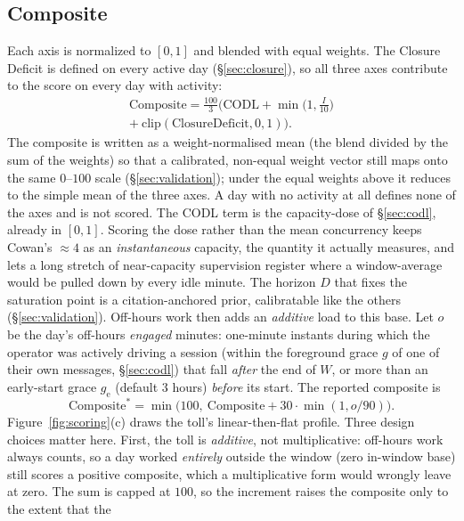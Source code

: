 \documentclass[10pt,twocolumn]{article}
\begin{document}
\subsection{Composite}\label{sec:composite}
Each axis is normalized to $[0,1]$ and blended with equal weights. The Closure
Deficit is defined on every active day (\S\ref{sec:closure}), so all three axes
contribute to the score on every day with activity:
\begin{multline}
\mathrm{Composite} = \frac{100}{3}\bigg(
\mathrm{CODL} +
\min\!\Big(1,\tfrac{I}{10}\Big) \\
+\ \mathrm{clip}(\mathrm{ClosureDeficit},0,1)
\bigg).
\end{multline}
The composite is written as a weight-normalised mean (the blend divided by the
sum of the weights) so that a calibrated, non-equal weight vector still maps onto
the same $0$--$100$ scale (\S\ref{sec:validation}); under the equal weights above
it reduces to the simple mean of the three axes. A day with no activity at all
defines none of the axes and is not scored.
The CODL term is the capacity-dose of \S\ref{sec:codl}, already in $[0,1]$.
Scoring the dose rather than the mean concurrency keeps Cowan's $\approx 4$ as an
\emph{instantaneous} capacity, the quantity it actually measures, and lets a long
stretch of near-capacity supervision register where a window-average would be
pulled down by every idle minute. The horizon $D$ that fixes the saturation point
is a citation-anchored prior, calibratable like the others (\S\ref{sec:validation}).
Off-hours work then adds an \emph{additive} load to this base. Let $o$ be the
day's off-hours \emph{engaged} minutes: one-minute instants during which the
operator was actively driving a session (within the foreground grace $g$ of one
of their own messages, \S\ref{sec:codl}) that fall \emph{after} the end of $W$,
or more than an early-start grace $g_{\mathrm{e}}$ (default $3$ hours) \emph{before} its
start. The reported composite is
\begin{equation}
\mathrm{Composite}^{\!*} = \min\!\big(100,\ \mathrm{Composite} + 30\cdot\min(1, o/90)\big).
\end{equation}
Figure~\ref{fig:scoring}(c) draws the toll's linear-then-flat profile.
Three design choices matter here. First, the toll is \emph{additive}, not
multiplicative: off-hours work always counts, so a day worked \emph{entirely}
outside the window (zero in-window base) still scores a positive composite,
which a multiplicative form would wrongly leave at zero. The sum is capped at
$100$, so the increment raises the composite only to the extent that the
\end{document}
